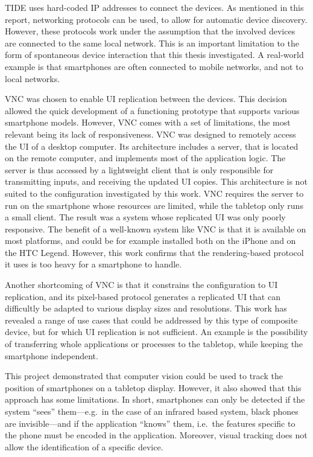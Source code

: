 TIDE uses hard-coded IP addresses to connect the devices.
As mentioned in this report, networking protocols can be used, to allow for automatic device discovery.
However, these protocols work under the assumption that the involved devices are connected to the same local network.
This is an important limitation to the form of spontaneous device interaction that this thesis investigated.
A real-world example is that smartphones are often connected to mobile networks, and not to local networks.

VNC \citep{Richardson:1998:vnc} was chosen to enable UI replication between the devices.
This decision allowed the quick development of a functioning prototype that supports various smartphone models.
However, VNC comes with a set of limitations, the most relevant being its lack of responsiveness.
VNC was designed to remotely access the UI of a desktop computer.
Its architecture includes a server, that is located on the remote computer, and implements most of the application logic.
The server is thus accessed by a lightweight client that is only responsible for transmitting inputs, and receiving the updated UI copies.
This architecture is not suited to the configuration investigated by this work.
VNC requires the server to run on the smartphone whose resources are limited, while the tabletop only runs a small client.
The result was a system whose replicated UI was only poorly responsive.
The benefit of a well-known system like VNC is that it is available on most platforms, and could be for example installed both on the iPhone and on the HTC Legend.
However, this work confirms that the rendering-based protocol it uses is too heavy for a smartphone to handle.

Another shortcoming of VNC is that it constrains the configuration to UI replication, and its pixel-based protocol generates a replicated UI that can difficultly be adapted to various display sizes and resolutions.
This work has revealed a range of use cases that could be addressed by this type of composite device, but for which UI replication is not sufficient.
An example is the possibility of transferring whole applications or processes to the tabletop, while keeping the smartphone independent.

This project demonstrated that computer vision could be used to track the position of smartphones on a tabletop display.
However, it also showed that this approach has some limitations.
In short, smartphones can only be detected if the system ``sees'' them---e.g.\ in the case of an infrared based system, black phones are invisible---and if the application ``knows'' them, i.e.\ the features specific to the phone must be encoded in the application.
Moreover, visual tracking does not allow the identification of a specific device.


